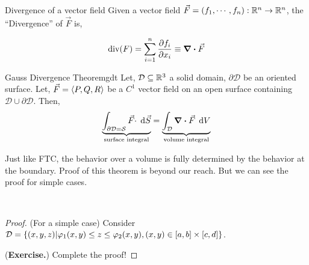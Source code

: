 \documentclass[../Analysis-3.tex]{subfiles}
\begin{document}
\begin{Def}{Divergence of a vector field}{}
  \small  Given a vector field $\vec{F} = (f_1,\cdots, f_n) : \mathbb{R}^n \to \mathbb{R}^n $, the ``Divergence'' of $\vec{F}$ is,

  \[\text{div}(F) = \sum_{i=1}^{n} \pdv{f_i}{x_i} \equiv \div \vec{F}\]
\end{Def}

\begin{Thm}{Gauss Divergence Theorem}{gdt}
  Let, $\mathcal{D} \subseteq \mathbb{R}^3$ a solid domain, $\partial{\mathcal{D}}$ be an oriented surface. Let,  $\vec{F} = \left\langle {P}, {Q,R} \right\rangle$ be a $C^1$ vector field on an open surface containing $\mathcal{D} \cup \partial{\mathcal{D}}$. Then,
  \[
    \underbrace{\int_{\partial{\mathcal{D}} = \mathcal{S}} {\vec{F}\cdot} \hspace{0.1cm} \dd {\vec{S}}}_\text{surface integral} = \underbrace{\int_{\mathcal{D}} {\div \vec{F}} \hspace{0.1cm} \dd {V}}_\text{volume integral}
  \]
\end{Thm}

Just like FTC, the behavior over a volume is fully determined by the behavior at the boundary. Proof of this theorem is beyond our reach. But we can see the proof for simple cases.

\

\begin{proof}
  (For a simple case) Consider $\mathcal{D} = \qty{(x,y,z) | \varphi_1(x,y) \le z \le \varphi_2(x,y), (x,y) \in [a,b]\times [c,d]}$.

  (\textbf{Exercise.}) Complete the proof!
\end{proof}
\end{document}
